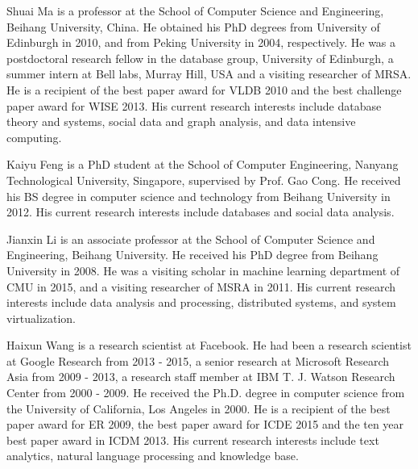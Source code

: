 \documentclass[10pt,journal,compsoc,twoside]{IEEEtran}
\begin{document}


\vspace{-6ex}
\begin{IEEEbiography}{Shuai Ma} is a professor at the School of Computer Science and Engineering, Beihang University, China.
He obtained his PhD degrees from University of Edinburgh in 2010, and from
Peking University in 2004, respectively. He was a postdoctoral research fellow in the database group,
University of Edinburgh, a summer intern at Bell labs, Murray Hill, USA and a visiting researcher of MRSA.
He is a recipient of the best paper award for VLDB 2010 and the best challenge paper award for WISE 2013. His current research interests include database theory and systems, social data and graph analysis, and data intensive computing.
\end{IEEEbiography}
\vspace{-6ex}
\begin{IEEEbiography}{Kaiyu Feng} is a PhD student at the School of Computer Engineering, Nanyang Technological University, Singapore, supervised by Prof. Gao Cong. He received his BS degree in computer science and technology from Beihang University in 2012. His current research interests include databases and social data analysis.
\end{IEEEbiography}
\vspace{-6ex}
\begin{IEEEbiography}{Jianxin Li} is an associate professor at the School of Computer Science and Engineering, Beihang University.  He received his PhD degree from Beihang University in 2008. He was a visiting scholar in machine learning department of CMU in 2015, and a visiting researcher of MSRA in 2011.  His current research interests include data analysis and processing, distributed systems, and system virtualization.
\end{IEEEbiography}
\vspace{-6ex}
\begin{IEEEbiography}{Haixun Wang} is a research scientist at
Facebook. He had been a research scientist at Google Research from 2013 - 2015, a senior research at Microsoft
Research Asia from 2009 - 2013, a research staff member at IBM T. J. Watson
Research Center from 2000 - 2009. He received the Ph.D. degree
in computer science from the University of California, Los Angeles in
2000.  He  is a recipient of the best paper award for
ER 2009, the best paper award for ICDE 2015 and the ten year best paper award in ICDM 2013. His current research interests include text analytics, natural language processing and knowledge base.
\end{IEEEbiography}
\end{document}
